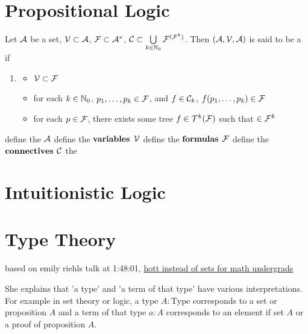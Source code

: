 \documentclass{book}
\begin{document}
	\newpage
	
	
	\chapter{Propositional Logic}
	
	\begin{defn} 
		Let $\mathcal{A}$ be a set, $\mathcal{V} \subset \mathcal{A}$, $\mathcal{F} \subset \mathcal{A}^*$, $\mathcal{C} \subset \bigcup\limits_{k \in \mathbb{N}_0} \mathcal{F}^{(\mathcal{F}^k)}$. Then $(\mathcal{A}, \mathcal{V}, \mathcal{A})$ is said to be a  
		if 
		\begin{enumerate}
			\item 
			\begin{itemize}
				\item $\mathcal{V} \subset \mathcal{F}$
				\item for each $k \in \mathbb{N}_0$, $p_1, \ldots, p_k \in \mathcal{F}$, and $f \in \mathcal{C}_k$, $f(p_1, \ldots, p_k) \in \mathcal{F}$
				\item for each $p \in \mathcal{F}$, there exists some tree $f \in \mathcal{T}^k(\mathcal{F})$ such that $ \in \mathcal{F}^{k}$ 
			\end{itemize}
		\end{enumerate}
		define the  $\mathcal{A}$
		define the $\textbf{variables}$ $\mathcal{V}$
		define the $\textbf{formulas}$ $\mathcal{F}$
		define the $\textbf{connectives}$ $\mathcal{C}$
		the 
	\end{defn}
	
	\begin{ex}
		
	\end{ex}
	
	
	\chapter{Intuitionistic Logic}
	
	
	
	
	
	
	
	
	
	\chapter{Type Theory}
	
	based on emily riehls talk at 1:48:01, \href{https://youtu.be/mTwvecBthpQ?t=6481}{hott instead of sets for math undergrads} 
	
	She explains that 'a type' and 'a term of that type' have various interpretations. For example in set theory or logic, a type $A: \text{Type}$ corresponds to a set or proposition $A$ and a term of that type $a: A$ corresponds to an element if set $A$ or a proof of proposition $A$. 
	
\end{document}
